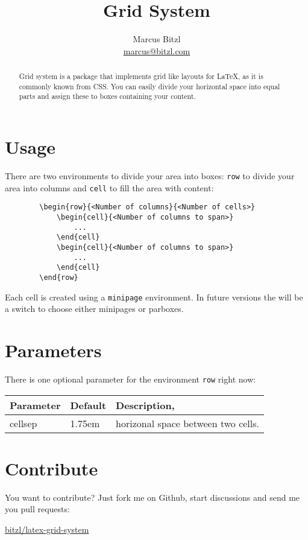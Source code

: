 \documentclass[DIV13,a4paper]{scrartcl}
\title{Grid System}
\author{Marcus Bitzl\\ \url{marcus@bitzl.com}}
\begin{document}
	\maketitle
	
	\begin{abstract}
		Grid system is a package that implements grid like layouts for \LaTeX, as it is commonly known from CSS. You can easily divide your horizontal space into equal parts and assign these to boxes containing your content.
	\end{abstract}
	
	\section{Usage}
	There are two environments to divide your area into boxes: \texttt{row} to divide your area into columns and \texttt{cell} to fill the area with content:
	
	\medskip
	
	\begin{lstlisting}
		\begin{row}{<Number of columns}{<Number of cells>}
			\begin{cell}{<Number of columns to span>}
				...
			\end{cell}
			\begin{cell}{<Number of columns to span>}
				...
			\end{cell}
		\end{row}
	\end{lstlisting}
	
	Each cell is created using a \texttt{minipage} environment. In future versions the will be a switch to choose either minipages or parboxes.
	
	\section{Parameters}
	There is one optional parameter for the environment \texttt{row} right now:
	
	\medskip
	
	\begin{tabularx}{\linewidth}{llX}\toprule
		\textbf{Parameter} & \textbf{Default} & \textbf{Description},\\ \midrule
		cellsep & 1.75em & horizonal space between two cells.\\\bottomrule
	\end{tabularx}
	
	\section{Contribute}
	You want to contribute? Just fork me on Github, start discussions and send me you pull requests: 
	\begin{center}
		\href{https://github.com/bitzl/latex-grid-system}{\ttfamily bitzl/latex-grid-system}
	\end{center}
	
\end{document}

